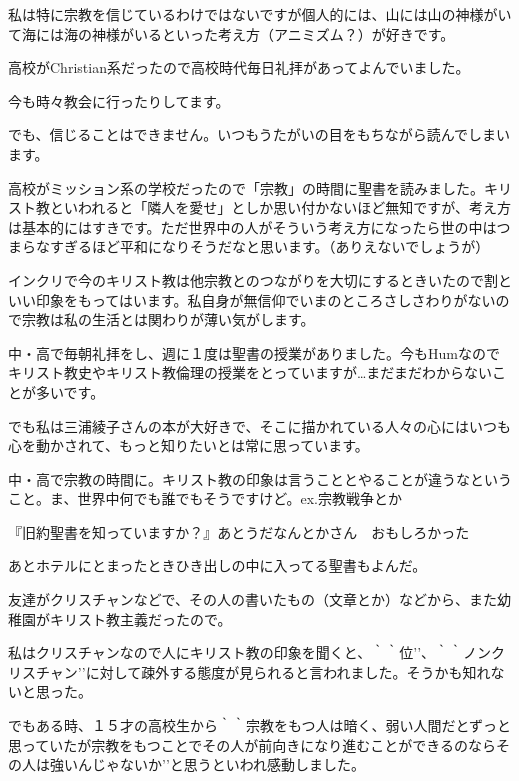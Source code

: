 私は特に宗教を信じているわけではないですが個人的には、山には山の神様がいて海には海の神様がいるといった考え方（アニミズム？）が好きです。

\item
高校がChristian系だったので高校時代毎日礼拝があってよんでいました。

今も時々教会に行ったりしてます。

でも、信じることはできません。いつもうたがいの目をもちながら読んでしまいます。

\item
高校がミッション系の学校だったので「宗教」の時間に聖書を読みました。キリスト教といわれると「隣人を愛せ」としか思い付かないほど無知ですが、考え方は基本的にはすきです。ただ世界中の人がそういう考え方になったら世の中はつまらなすぎるほど平和になりそうだなと思います。（ありえないでしょうが）

インクリで今のキリスト教は他宗教とのつながりを大切にするときいたので割といい印象をもってはいます。私自身が無信仰でいまのところさしさわりがないので宗教は私の生活とは関わりが薄い気がします。

\item
中・高で毎朝礼拝をし、週に１度は聖書の授業がありました。今もHumなのでキリスト教史やキリスト教倫理の授業をとっていますが…まだまだわからないことが多いです。

でも私は三浦綾子さんの本が大好きで、そこに描かれている人々の心にはいつも心を動かされて、もっと知りたいとは常に思っています。

\item
中・高で宗教の時間に。キリスト教の印象は言うこととやることが違うなということ。ま、世界中何でも誰でもそうですけど。ex.宗教戦争とか

\item
『旧約聖書を知っていますか？』あとうだなんとかさん　おもしろかった

あとホテルにとまったときひき出しの中に入ってる聖書もよんだ。

\item
友達がクリスチャンなどで、その人の書いたもの（文章とか）などから、また幼稚園がキリスト教主義だったので。

\item
私はクリスチャンなので人にキリスト教の印象を聞くと、｀｀位’’、｀｀ノンクリスチャン’’に対して疎外する態度が見られると言われました。そうかも知れないと思った。

でもある時、１５才の高校生から｀｀宗教をもつ人は暗く、弱い人間だとずっと思っていたが宗教をもつことでその人が前向きになり進むことができるのならその人は強いんじゃないか’’と思うといわれ感動しました。

